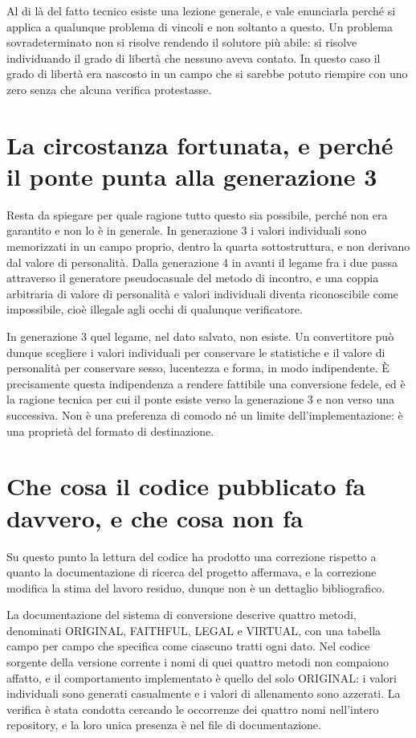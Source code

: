 Al di là del fatto tecnico esiste una lezione generale, e vale enunciarla perché si applica a qualunque problema di vincoli e non soltanto a questo. Un problema sovradeterminato non si risolve rendendo il solutore più abile: si risolve individuando il grado di libertà che nessuno aveva contato. In questo caso il grado di libertà era nascosto in un campo che si sarebbe potuto riempire con uno zero senza che alcuna verifica protestasse.

\section{La circostanza fortunata, e perché il ponte punta alla generazione 3}

Resta da spiegare per quale ragione tutto questo sia possibile, perché non era garantito e non lo è in generale. In generazione 3 i valori individuali sono memorizzati in un campo proprio, dentro la quarta sottostruttura, e non derivano dal valore di personalità. Dalla generazione 4 in avanti il legame fra i due passa attraverso il generatore pseudocasuale del metodo di incontro, e una coppia arbitraria di valore di personalità e valori individuali diventa riconoscibile come impossibile, cioè illegale agli occhi di qualunque verificatore.

In generazione 3 quel legame, nel dato salvato, non esiste. Un convertitore può dunque scegliere i valori individuali per conservare le statistiche e il valore di personalità per conservare sesso, lucentezza e forma, in modo indipendente. È precisamente questa indipendenza a rendere fattibile una conversione fedele, ed è la ragione tecnica per cui il ponte esiste verso la generazione 3 e non verso una successiva. Non è una preferenza di comodo né un limite dell'implementazione: è una proprietà del formato di destinazione.

\section{Che cosa il codice pubblicato fa davvero, e che cosa non fa}

Su questo punto la lettura del codice ha prodotto una correzione rispetto a quanto la documentazione di ricerca del progetto affermava, e la correzione modifica la stima del lavoro residuo, dunque non è un dettaglio bibliografico.

La documentazione del sistema di conversione descrive quattro metodi, denominati ORIGINAL, FAITHFUL, LEGAL e VIRTUAL, con una tabella campo per campo che specifica come ciascuno tratti ogni dato. Nel codice sorgente della versione corrente i nomi di quei quattro metodi non compaiono affatto, e il comportamento implementato è quello del solo ORIGINAL: i valori individuali sono generati casualmente e i valori di allenamento sono azzerati. La verifica è stata condotta cercando le occorrenze dei quattro nomi nell'intero repository, e la loro unica presenza è nel file di documentazione.

